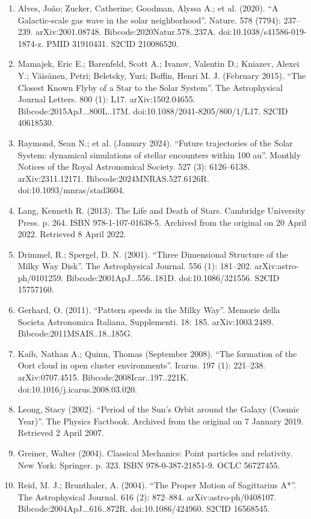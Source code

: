 \begin{enumerate}
\item Alves, João; Zucker, Catherine; Goodman, Alyssa A.; et al. (2020). ``A Galactic-scale gas wave in the solar neighborhood''. Nature. 578 (7794): 237–239. arXiv:2001.08748. Bibcode:2020Natur.578..237A. doi:10.1038/s41586-019-1874-z. PMID 31910431. S2CID 210086520.
\item Mamajek, Eric E.; Barenfeld, Scott A.; Ivanov, Valentin D.; Kniazev, Alexei Y.; Väisänen, Petri; Beletsky, Yuri; Boffin, Henri M. J. (February 2015). ``The Closest Known Flyby of a Star to the Solar System''. The Astrophysical Journal Letters. 800 (1): L17. arXiv:1502.04655. Bibcode:2015ApJ...800L..17M. doi:10.1088/2041-8205/800/1/L17. S2CID 40618530.
\item Raymond, Sean N.; et al. (January 2024). ``Future trajectories of the Solar System: dynamical simulations of stellar encounters within 100 au''. Monthly Notices of the Royal Astronomical Society. 527 (3): 6126–6138. arXiv:2311.12171. Bibcode:2024MNRAS.527.6126R. doi:10.1093/mnras/stad3604.
\item Lang, Kenneth R. (2013). The Life and Death of Stars. Cambridge University Press. p. 264. ISBN 978-1-107-01638-5. Archived from the original on 20 April 2022. Retrieved 8 April 2022.
\item Drimmel, R.; Spergel, D. N. (2001). ``Three Dimensional Structure of the Milky Way Disk''. The Astrophysical Journal. 556 (1): 181–202. arXiv:astro-ph/0101259. Bibcode:2001ApJ...556..181D. doi:10.1086/321556. S2CID 15757160.
\item Gerhard, O. (2011). ``Pattern speeds in the Milky Way''. Memorie della Societa Astronomica Italiana, Supplementi. 18: 185. arXiv:1003.2489. Bibcode:2011MSAIS..18..185G.
\item Kaib, Nathan A.; Quinn, Thomas (September 2008). ``The formation of the Oort cloud in open cluster environments''. Icarus. 197 (1): 221–238. arXiv:0707.4515. Bibcode:2008Icar..197..221K. doi:10.1016/j.icarus.2008.03.020.
\item Leong, Stacy (2002). ``Period of the Sun's Orbit around the Galaxy (Cosmic Year)''. The Physics Factbook. Archived from the original on 7 January 2019. Retrieved 2 April 2007.
\item Greiner, Walter (2004). Classical Mechanics: Point particles and relativity. New York: Springer. p. 323. ISBN 978-0-387-21851-9. OCLC 56727455.
\item Reid, M. J.; Brunthaler, A. (2004). ``The Proper Motion of Sagittarius A*''. The Astrophysical Journal. 616 (2): 872–884. arXiv:astro-ph/0408107. Bibcode:2004ApJ...616..872R. doi:10.1086/424960. S2CID 16568545.

\end{enumerate}
